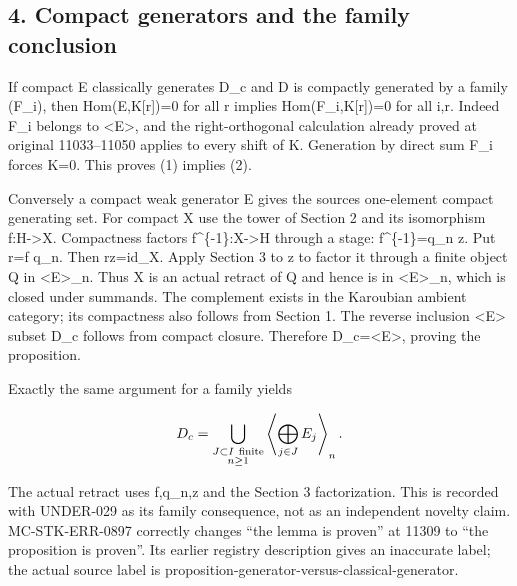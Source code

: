 \documentclass[11pt]{article}
\begin{document}
\subsection{4. Compact generators and the family conclusion}\label{proofs-11121-11450-compact-generators-and-the-family-conclusion}

If compact E classically generates D\_\allowbreak{}c and D is compactly generated by a family (F\_\allowbreak{}i)\allowbreak{},\allowbreak{} then Hom(E,\allowbreak{}K[r]\allowbreak{})\allowbreak{}\allowbreak{}=0 for all r implies Hom(F\_\allowbreak{}i,\allowbreak{}K[r]\allowbreak{})\allowbreak{}\allowbreak{}=0 for all i,\allowbreak{}r. Indeed F\_\allowbreak{}i belongs to <E>,\allowbreak{} and the right-orthogonal calculation already proved at original 11033–\allowbreak{}11050 applies to every shift of K. Generation by direct sum F\_\allowbreak{}i forces K\allowbreak{}=0. This proves (1)\allowbreak{} implies (2)\allowbreak{}.

Conversely a compact weak generator E gives the source\textquotesingle s one-element compact generating set. For compact X use the tower of Section 2 and its isomorphism f:\allowbreak{}H\allowbreak{}->X. Compactness factors f\textasciicircum{}\{-1\}:\allowbreak{}X\allowbreak{}->H through a stage:\allowbreak{} f\textasciicircum{}\{-1\}\allowbreak{}=q\_\allowbreak{}n z. Put r\allowbreak{}=f q\_\allowbreak{}n. Then rz\allowbreak{}=id\_\allowbreak{}X. Apply Section 3 to z to factor it through a finite object Q in <E>\_\allowbreak{}n. Thus X is an actual retract of Q and hence is in <E>\_\allowbreak{}n,\allowbreak{} which is closed under summands. The complement exists in the Karoubian ambient category; its compactness also follows from Section 1. The reverse inclusion \textless E\textgreater{} subset D\_\allowbreak{}c follows from compact closure. Therefore D\_\allowbreak{}c\allowbreak{}=<E>,\allowbreak{} proving the proposition.

Exactly the same argument for a family yields

\[
 D_c=\bigcup_{\substack{J\subset I\ {\rm finite}\\ n\geq1}}
          \left\langle\bigoplus_{j\in J}E_j\right\rangle_n .
\]

The actual retract uses f,\allowbreak{}q\_\allowbreak{}n,\allowbreak{}z and the Section 3 factorization. This is recorded with UNDER-029 as its family consequence,\allowbreak{} not as an independent novelty claim. MC-STK-ERR-0897 correctly changes ``the lemma is proven'' at 11309 to ``the proposition is proven''. Its earlier registry description gives an inaccurate label; the actual source label is proposition-generator-versus-classical-generator.
\end{document}
